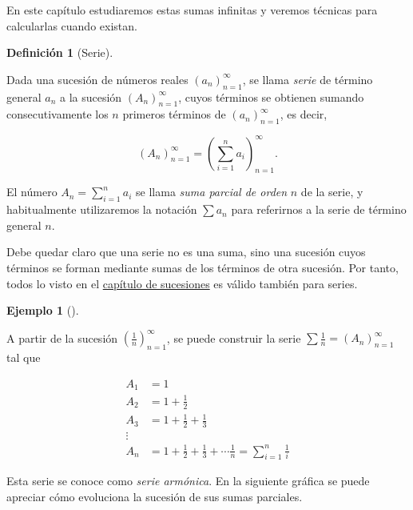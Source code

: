 \documentclass[
  a4paper,
]{scrreport}
\theoremstyle{plain}
\theoremstyle{plain}
\theoremstyle{definition}
\newtheorem{definition}{Definición}[chapter]
\theoremstyle{definition}
\newtheorem{example}{Ejemplo}[chapter]
\theoremstyle{plain}
\theoremstyle{remark}
\begin{document}
En este capítulo estudiaremos estas sumas infinitas y veremos técnicas
para calcularlas cuando existan.

\leavevmode{}%
\begin{definition}[Serie]\label{def-serie}

Dada una sucesión de números reales \((a_n)_{n=1}^\infty\), se llama
\emph{serie} de término general \(a_n\) a la sucesión
\((A_n)_{n=1}^\infty\), cuyos términos se obtienen sumando
consecutivamente los \(n\) primeros términos de \((a_n)_{n=1}^\infty\),
es decir,

\[
(A_n)_{n=1}^\infty= \left(\sum_{i=1}^na_i\right)_{n=1}^\infty.
\]

El número \(A_n=\sum_{i=1}^n a_i\) se llama \emph{suma parcial de orden}
\(n\) de la serie, y habitualmente utilizaremos la notación \(\sum a_n\)
para referirnos a la serie de término general \(n\).

\end{definition}

\begin{tcolorbox}[enhanced jigsaw, breakable, bottomrule=.15mm, coltitle=black, bottomtitle=1mm, opacityback=0, title=\textcolor{quarto-callout-important-color}{\faExclamation}\hspace{0.5em}{Importante}, left=2mm, toptitle=1mm, toprule=.15mm, opacitybacktitle=0.6, colframe=quarto-callout-important-color-frame, arc=.35mm, colback=white, rightrule=.15mm, titlerule=0mm, leftrule=.75mm, colbacktitle=quarto-callout-important-color!10!white]

Debe quedar claro que una serie no es una suma, sino una sucesión cuyos
términos se forman mediante sumas de los términos de otra sucesión. Por
tanto, todos lo visto en el
\href{https://aprendeconalf.es/analisis-manual/sucesiones.html}{capítulo
de sucesiones} es válido también para series.

\end{tcolorbox}

\leavevmode{}%
\begin{example}[]\label{exm-serie}

A partir de la sucesión \(\left(\frac{1}{n}\right)_{n=1}^\infty\), se
puede construir la serie \(\sum \frac{1}{n}=(A_n)_{n=1}^\infty\) tal que

\begin{align*}
A_1 &= 1\\ 
A_2 &= 1+\frac{1}{2}\\ 
A_3 &= 1+\frac{1}{2}+\frac{1}{3}\\ 
\vdots\\ 
A_n &= 1+\frac{1}{2}+\frac{1}{3}+\cdots \frac{1}{n} = \sum_{i=1}^n\frac{1}{i} 
\end{align*}

Esta serie se conoce como \emph{serie armónica}. En la siguiente gráfica
se puede apreciar cómo evoluciona la sucesión de sus sumas parciales.

\end{example}
\end{document}
